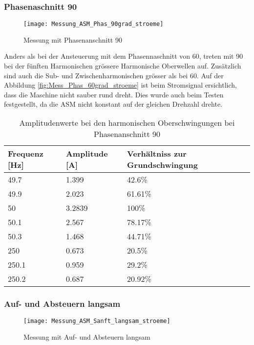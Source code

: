 \newpage
\subsubsection*{Phasenaschnitt 90\textdegree}
\begin{figure}[ht!]
	\centering
	\texttt{[image: Messung\_ASM\_Phas\_90grad\_stroeme]}	
	\caption{Messung mit Phasenanschnitt 90\textdegree}\label{fig:Mess_Phas_90grad_stroeme}
\end{figure}
Anders als bei der Ansteuerung mit dem Phasennaschnitt von 60\textdegree, treten mit 90\textdegree \hspace{0.02cm} bei der fünften Harmonischen grössere Harmonische Oberwellen auf. Zusätzlich sind auch die Sub- und Zwischenharmonischen grösser als bei 60\textdegree. Auf der Abbildung \ref{fig:Mess_Phas_60grad_stroeme} ist beim Stromsignal ersichtlich, dass die Maschine nicht sauber rund dreht. Dies wurde auch beim Testen festgestellt, da die ASM nicht konstant auf der gleichen Drehzahl drehte.  
\begin{table}[ht!]
	\centering
	\begin{tabular}{|l|l|l|}
		\hline
		Frequenz {[}Hz{]} & Amplitude {[}A{]} & Verhältniss zur Grundschwingung	\\ \hline
		49.7              & 1.399             & 42.6\%							\\ \hline
		49.9              & 2.023             & 61.61\%							\\ \hline
		50                & 3.2839            & 100\%							\\ \hline
		50.1              & 2.567             & 78.17\%							\\ \hline
		50.3              & 1.468             & 44.71\%							\\ \hline
		250               & 0.673             & 20.5\%							\\ \hline
		250.1             & 0.959             & 29.2\%							\\ \hline
		250.2             & 0.687             & 20.92\%							\\ \hline
	\end{tabular}
	\caption{Amplitudenwerte bei den harmonischen Oberschwingungen bei Phasenanschnitt 90\textdegree}\label{tab:Phas_90_ASM_stroeme}
\end{table}




\newpage
\subsubsection*{Auf- und Absteuern langsam}
\begin{figure}[ht!]
	\centering
	\texttt{[image: Messung\_ASM\_Sanft\_langsam\_stroeme]}	
	\caption{Messung mit Auf- und Absteuern langsam}\label{fig:Mess_Sanft_langsam_stroeme}
\end{figure}


